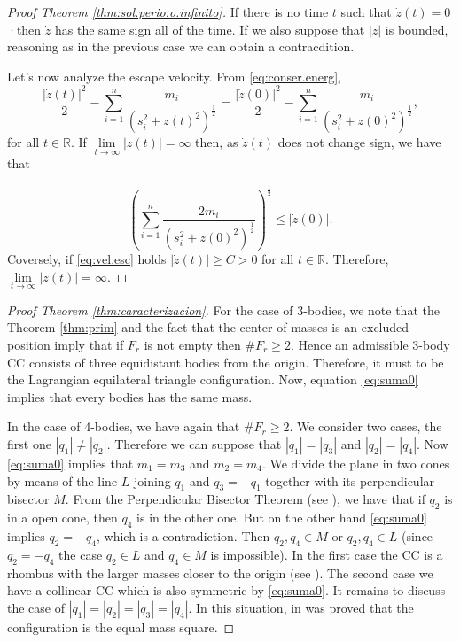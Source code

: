 \documentclass[twoside]{article}
\theoremstyle{remark}
\newcommand{\rr}{\mathbb{R}}
\begin{document}
\begin{proof}[Proof  Theorem \ref{thm:sol.perio.o.infinito}]
If there is no time $t$ such that $\dot{z}(t)=0$ ·then $\dot{z}$ has the same sign all of the time. If we also suppose that $|z|$ is bounded, reasoning as in the previous case we can obtain a contracdition. 

Let's now analyze the escape velocity. From \eqref{eq:conser.energ}, 
\[\frac{|\dot{z}(t)|^2}{2}-\sum_{i=1}^{n} \frac{m_i}{\left(s_i^2+z(t)^2\right)^{\frac12}}=\frac{|\dot{z}(0)|^2}{2}-\sum_{i=1}^{n} \frac{m_i}{\left(s_i^2+z(0)^2\right)^{\frac12}},\]
for all $t\in\rr$. If $\lim\limits_{t\to\infty}|z(t)|=\infty$ then, as $\dot{z}(t)$ does not change sign, we have that

\begin{equation}\label{eq:vel.esc}
\left(\sum_{i=1}^{n} \frac{2m_i}{\left(s_i^2+z(0)^2\right)^{\frac12}}\right)^{\frac12}\leq |\dot{z}(0)|.
\end{equation}
Coversely, if \eqref{eq:vel.esc} holds $|\dot{z}(t)|\geq C>0$ for all $t\in\rr$. Therefore, $\lim\limits_{t\to\infty}|z(t)|=\infty$. 
\end{proof}


\begin{proof}[Proof Theorem \ref{thm:caracterizacion}]
For the case of 3-bodies, we note that the Theorem \ref{thm:prim} and the fact that the center of masses is an excluded position imply that if $F_r$ is not empty then $\# F_r\geq 2$. Hence an admissible 3-body CC consists of three equidistant bodies from the origin. Therefore, it must to be the Lagrangian equilateral triangle configuration. Now, equation \eqref{eq:suma0} implies that every bodies has the same mass.

In the case of 4-bodies, we have again that $\# F_r\geq 2$.  We consider two cases, the first one  $|q_1|\neq|q_2|$.  Therefore we can suppose that $|q_1|=|q_3|$ and $|q_2|=|q_4|$. Now \eqref{eq:suma0} implies that
 $m_1=m_3$ and $m_2=m_4$.  We divide the plane in two cones by means of  the line $L$ joining $q_1$  and $q_3=-q_1$ together with its perpendicular bisector $M$.  From the Perpendicular Bisector Theorem (see \cite{moeckel1990central}), we have that if  $q_2$  is in a open cone, then  $q_4$ is in the other one. But on the other hand \eqref{eq:suma0} implies $q_2=-q_4$, which is a contradiction. Then $q_2,q_4\in M$ or $q_2,q_4\in L$ (since $q_2=-q_4$ the case $q_2\in L$ and $q_4\in M$ is impossible). In the first case the CC is a rhombus with the larger masses closer to the origin (see  \cite{perez2007convex}). The second case we have a collinear CC which is also symmetric by  \eqref{eq:suma0}.
 It remains to discuss the case of $|q_1|=|q_2|=|q_3|=|q_4|$. In this situation, in \cite{hampton2005co} was proved that the configuration is the equal mass square.

\end{proof} 
\end{document}
